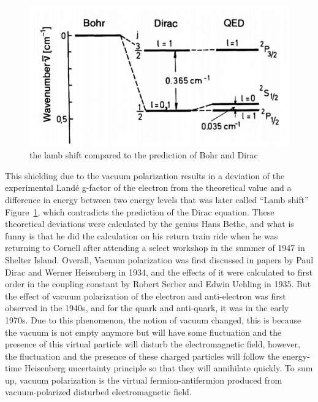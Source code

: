 \documentclass{article}
\begin{document}
\begin{figure}[!th]
	\centering
	\includegraphics[width=0.5\linewidth]{figures/lamb-shift.png}
	\caption{the lamb shift compared to the prediction of Bohr and Dirac}
	\label{fig:lamb-shift}
\end{figure}
This shielding due to the vacuum polarization results in a deviation of the experimental Landé g-factor of the electron from the theoretical value and a difference in energy between two energy levels that was later called “Lamb shift” Figure~\ref{fig:lamb-shift}, which contradicts the prediction of the Dirac equation. These theoretical deviations were calculated by the genius Hans Bethe, and what is funny is that he did the calculation on his return train ride when he was returning to Cornell after attending a select workshop in the summer of 1947 in Shelter Island.
Overall, Vacuum polarization was first discussed in papers by Paul Dirac and Werner Heisenberg in 1934, and the effects of it were calculated to first order in the coupling constant by Robert Serber and Edwin Uehling in 1935. But the effect of vacuum polarization of the electron and anti-electron was first observed in the 1940s, and for the quark and anti-quark, it was in the early 1970s.
Due to this phenomenon, the notion of vacuum changed, this is because the vacuum is not empty anymore but will have some fluctuation and the presence of this virtual particle will disturb the electromagnetic field, however, the fluctuation and the presence of these charged particles will follow the energy-time Heisenberg uncertainty principle so that they will annihilate quickly.
To sum up, vacuum polarization is the virtual fermion-antifermion produced from vacuum-polarized disturbed electromagnetic field.
\end{document}

